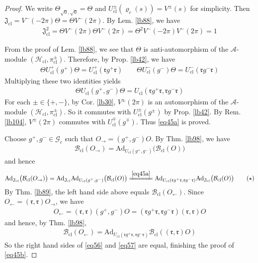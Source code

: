 \documentclass[11pt,b5paper,notitlepage]{article}
\theoremstyle{definition}
\theoremstyle{plain}
\newcommand{\ovl}{\overline}
\newcommand{\Ad}{\mathrm{Ad}}
\newcommand{\Gc}{\mathscr G_c}
\newcommand{\cl}{\mathrm{cl}}
\newcommand{\rk}{\mathfrak r}
\newcommand{\MA}{\mathcal A}
\newcommand{\sqz}{{\sqrt 0}}
\newcommand{\Bcl}{\mathcal B_{\mathrm{cl}}}
\newcommand{\Hcl}{\mathcal H_{\mathrm{cl}}}
\newcommand{\Ucl}{U_{\mathrm{cl}}}
\newcommand{\Jcl}{\mathfrak J_{\mathrm{cl}}}
\numberwithin{equation}{section}
\begin{document}
\begin{proof}
We write $\Theta_{\sqz,\ovl{\sqz}}=\Theta$ and $\Ucl^\pm(\varrho_c(s))=V^\pm(s)$ for simplicity. Then $\Jcl=V^-(-2\pi)\Theta=\Theta V^-(2\pi)$. By Lem. \ref{lb88}, we have
\begin{align*}
\Jcl^2=\Theta V^-(2\pi)\Theta V^-(2\pi)=\Theta^2 V^-(-2\pi)V^-(2\pi)=1
\end{align*}

From the proof of Lem. \ref{lb88}, we see that $\Theta$ is anti-automorphism of the $\MA$-module $(\Hcl,\pi^\pm_\cl)$. Therefore, by Prop. \ref{lb42}, we have
\begin{align*}
\Theta \Ucl^+(g^+)\Theta=\Ucl^+(\rk g^+\rk)\qquad \Theta \Ucl^-(g^-)\Theta=\Ucl^-(\rk g^-\rk)
\end{align*}
Multiplying these two identities yields
\begin{align*}
\Theta\Ucl(g^+,g^-)\Theta=U_\cl(\rk g^+\rk,\rk g^-\rk)
\end{align*}
For each $\pm\in\{+,-\}$, by Cor. \ref{lb30}, $V^\pm(2\pi)$ is an automorphism of the $\MA$-module $(\Hcl,\pi^\pm_\cl)$. So it commutes with $\Ucl^\pm(g^\pm)$ by Prop. \ref{lb42}. By Rem. \ref{lb104}, $V^\pm(2\pi)$ commutes with $\Ucl^\mp(g^\mp)$. Thus \eqref{eq45a} is proved.


Choose $g^+,g^-\in\Gc$ such that $O_\rightarrow=(g^+,g^-)O$. By Thm. \ref{lb98}, we have
\begin{align*}
\Bcl(O_\rightarrow)=\Ad_{\Ucl(g^+,g^-)}\big(\Bcl(O)\big)
\end{align*}
and hence
\begin{align*}
\Ad_{\Jcl}\big(\Bcl(O_\rightarrow)\big)=\Ad_{\Jcl}\Ad_{\Ucl(g^+,g^-)}\big(\Bcl(O)\big)\xlongequal{\eqref{eq45a}}\Ad_{\Ucl(\rk g^+\rk,\rk g^-\rk)}\Ad_{\Jcl}\big(\Bcl(O)\big)  \tag{$\star$}\label{eq56}
\end{align*}
By Thm. \ref{lb89}, the left hand side above equals $\Bcl(O_\leftarrow)$. Since $O_\leftarrow=(\rk,\rk)O_\rightarrow$, we have
\begin{align*}
O_\leftarrow=(\rk,\rk)(g^+,g^-)O=(\rk g^+\rk,\rk g^-\rk)(\rk,\rk)O
\end{align*}
and hence, by Thm. \ref{lb98},
\begin{align*}
\Bcl(O_\leftarrow)=\Ad_{\Ucl(\rk g^+\rk,\rk g^-\rk)}\Bcl((\rk,\rk)O)  \tag{$\star\star$}\label{eq57}
\end{align*}
So the right hand sides of \eqref{eq56} and \eqref{eq57} are equal, finishing the proof of \eqref{eq45b}.
\end{proof}
\end{document}
